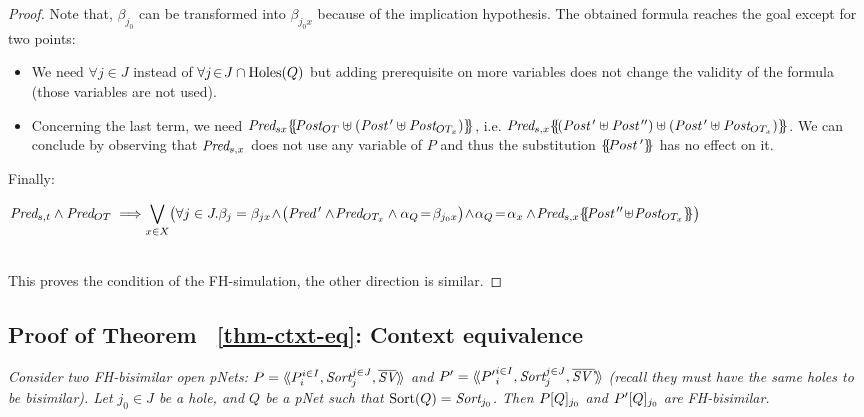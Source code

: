 \documentclass{lmcs}
\newcommand{\TODO}[1]{\textcolor{red}{\textbf{[TODO:#1]}}}
\begin{document}
\begin{proof}
 Note that, $\beta_{j_0}$ can be transformed into  $\beta_{j_0 x}$ because of the 
 implication hypothesis.
% 
 The obtained formula reaches the goal except for 
 two points:
 \begin{itemize}
 	\item We need $\forall j\!\in\! J$ instead of $\forall j\!\in\! J\cap\operatorname{Holes}(Q)$  but  
 	adding prerequisite on more variables 
 	does not   	change the validity of the formula (those variables are not used).
\fussy
 	\item Concerning the last term, we need 
 	$\Pred_{s x}\subst{\Post_{OT}\uplus(\Post\,'\uplus \Post_{OT_x})}$, i.e.
 	$\Pred_{s, x}\subst{(\Post\,'\uplus 	\Post\,'')\uplus(\Post\,'\uplus \Post_{OT_x})}$. We 
 	can conclude by observing that	$\Pred_{s,x}$ does not use any variable of $P$ 
 	and thus the substitution $\{\hspace{-0.68ex}\{\!Post\,'\}\hspace{-0.67ex}\}$ has no effect on it.
\sloppy
 \end{itemize}	
Finally: \\
\begin{small} $\Pred_{s,t} \land \Pred_{OT} \implies\\
{\displaystyle\bigvee_{x\in X}
 		\!\left( \forall j\in J. \beta_j=\beta_{jx} \! \land\! 
 		\big(\Pred\,'\land\! \Pred_{OT_x}
 		 \land \alpha_Q\!=\!\beta_{j_0 x}\right)\! \land\! \alpha_Q\!=\!\alpha_x\land\!  \Pred_{s, x}\subst{\Post\,''\!\uplus\!\Post_{OT_x}}\big)
 		}$
 		\end{small}\\
This proves the  condition of the FH-simulation, the other direction is 
 similar.
\end{proof}

        \subsection{Proof of Theorem ~\ref{thm-ctxt-eq}: Context equivalence}
\textit{	Consider two FH-bisimilar open pNets:
	$\pNet = \mylangle \pNet_i^{i\in I}, \Sort_j^{j\in J}, 
	\set{\symb{SV}}\myrangle$ and 	$\pNet' = \mylangle {\pNet'}_i^{i\in I}, 
	\Sort_j^{j\in 
	J}, 	\set{\symb{SV'}}\myrangle$ 
	(recall they must have the same holes to be bisimilar).
	Let $j_0\in J$ be a hole, and $Q$ be a pNet such that $\Sortop(Q)=\Sort_{j_0}$. Then 
	$P[Q]_{j_0}$ and 
	$P'[Q]_{j_0}$ are FH-bisimilar.
}
\end{document}
